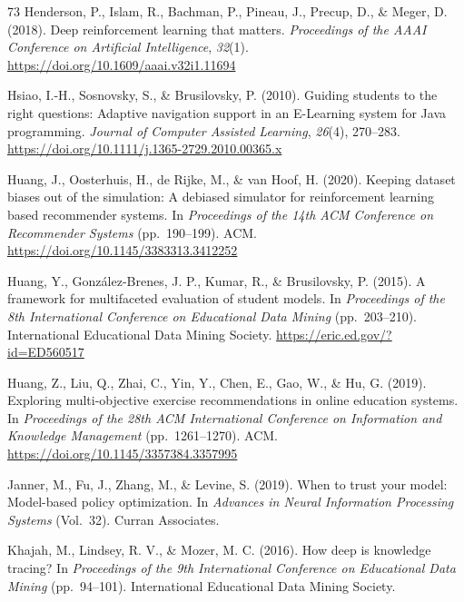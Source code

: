 \documentclass[a4paper,preprint,12pt,authoryear]{elsarticle}
\begin{document}
\begin{thebibliography}{73}
Henderson, P., Islam, R., Bachman, P., Pineau, J., Precup, D., \& Meger, D. (2018). Deep reinforcement learning that matters. \textit{Proceedings of the AAAI Conference on Artificial Intelligence}, \textit{32}(1). \url{https://doi.org/10.1609/aaai.v32i1.11694}

Hsiao, I.-H., Sosnovsky, S., \& Brusilovsky, P. (2010). Guiding students to the right questions: Adaptive navigation support in an E-Learning system for Java programming. \textit{Journal of Computer Assisted Learning}, \textit{26}(4), 270--283. \url{https://doi.org/10.1111/j.1365-2729.2010.00365.x}

Huang, J., Oosterhuis, H., de Rijke, M., \& van Hoof, H. (2020). Keeping dataset biases out of the simulation: A debiased simulator for reinforcement learning based recommender systems. In \textit{Proceedings of the 14th ACM Conference on Recommender Systems} (pp.~190--199). ACM. \url{https://doi.org/10.1145/3383313.3412252}

Huang, Y., González-Brenes, J. P., Kumar, R., \& Brusilovsky, P. (2015). A framework for multifaceted evaluation of student models. In \textit{Proceedings of the 8th International Conference on Educational Data Mining} (pp.~203--210). International Educational Data Mining Society. \url{https://eric.ed.gov/?id=ED560517}

Huang, Z., Liu, Q., Zhai, C., Yin, Y., Chen, E., Gao, W., \& Hu, G. (2019). Exploring multi-objective exercise recommendations in online education systems. In \textit{Proceedings of the 28th ACM International Conference on Information and Knowledge Management} (pp.~1261--1270). ACM. \url{https://doi.org/10.1145/3357384.3357995}

Janner, M., Fu, J., Zhang, M., \& Levine, S. (2019). When to trust your model: Model-based policy optimization. In \textit{Advances in Neural Information Processing Systems} (Vol.~32). Curran Associates.

Khajah, M., Lindsey, R. V., \& Mozer, M. C. (2016). How deep is knowledge tracing? In \textit{Proceedings of the 9th International Conference on Educational Data Mining} (pp.~94--101). International Educational Data Mining Society.


\end{thebibliography}
\end{document}
